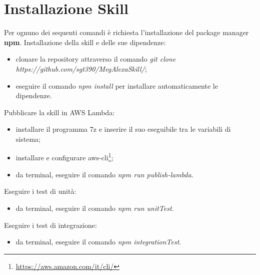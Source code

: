 \section{Installazione Skill}
\label{installazioneSkill}
Per ognuno dei sequenti comandi è richiesta l'installazione del package manager \textbf{npm}.
Installazione della skill e delle sue dipendenze:
\begin{itemize}
    \item clonare la repository attraverso il comando \textit{git clone\\https://github.com/sgt390/MegAlexaSkill/};
    \item eseguire il comando \textit{npm install} per installare automaticamente le dipendenze.
\end{itemize}
Pubblicare la skill in AWS Lambda:
\begin{itemize}
    \item installare il programma 7z e inserire il suo eseguibile tra le variabili di sistema;
    \item installare e configurare aws-cli\footnote{\url{https://aws.amazon.com/it/cli/}};
    \item da terminal, eseguire il comando \textit{npm run publish-lambda}.
\end{itemize}
Eseguire i test di unità:
\begin{itemize}
    \item da terminal, eseguire il comando \textit{npm run unitTest}.
\end{itemize}
Eseguire i test di integrazione:
\begin{itemize}
    \item da terminal, eseguire il comando \textit{npm integrationTest}.
\end{itemize}
